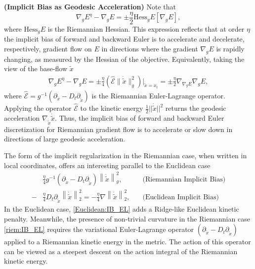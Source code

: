 \documentclass[reqno,11pt,letterpaper]{amsart}
\theoremstyle{plain}
\theoremstyle{definition}
\theoremstyle{remark}
\newcommand{\lr}[1]{\left(#1\right)}
\begin{document}
\textbf{(Implicit Bias as Geodesic Acceleration)} Note that
    \[
        \nabla_g E^\eta - \nabla_g E =\pm \frac{\eta}{2}\mathrm{Hess}_g E [\nabla_g E],
    \]
    where $\mathrm{Hess}_g E$ is the Riemannian Hessian. This expression reflects that at order $\eta$ the implicit bias of forward and backward Euler is to accelerate and decelerate, respectively, gradient flow on $E$ in directions where the gradient $\nabla_g E$ is rapidly changing, as measured by the Hessian of the objective. Equivalently, taking the view of the base-flow $\tilde{x}$
    \begin{align}\label{eq:EL_Riemann}
        \nabla_g E^\eta - \nabla_g E =\pm \frac{\eta}{4} \lr{\hat{\mathcal{E}} \big\lVert\dot{\tilde{x}}\big\rVert_{g}^2}\bigg|_{\dot{\tilde{x}} = \dot{x}_t} = \pm \frac{\eta}{2}\nabla_{\nabla_g E} \nabla_g E,
    \end{align}
where $\hat{\mathcal{E}} = g^{-1}(\partial_{\tilde{x}} - D_{t} \partial_{\dot{\tilde{x}}})$ is the Riemannian Euler-Lagrange operator. Applying the operator $\hat{\mathcal{E}}$ to the kinetic energy $\frac{1}{2}||\dot{\tilde{x}}||^2$ returns the geodesic acceleration $\nabla_{\dot{\tilde{x}}} \dot{\tilde{x}}$. Thus, the implicit bias of  forward and backward Euler discretization for Riemannian gradient flow is to accelerate or slow down in directions of large geodesic acceleration.

The form of the implicit regularization in the Riemannian case, when written in local coordinates, offers an interesting parallel to the Euclidean case \cite{smith2021on}
\begin{align}
    &\frac{\eta}{4}g^{-1}(\partial_{\tilde{x}} - D_{t} \partial_{\dot{\tilde{x}}}) \left\lVert \dot{\tilde{x}} \right\rVert_{g}^{2}, \quad
    &\text{(Riemannian Implicit Bias)} \label{riem:IB_EL}\\
    -&\frac{\eta}{4} D_{t} \partial_{\dot{\tilde{x}}} \left\lVert \dot{\tilde{x}}  \right\rVert_{2}^{2} = -\frac{\eta}{4} \nabla \left\lVert \dot{\tilde{x}}  \right\rVert_{2}^{2}, \quad
    &\text{(Euclidean Implicit Bias)}\label{Euclidean:IB_EL}
\end{align}
In the Euclidean case, \eqref{Euclidean:IB_EL} adds a Ridge-like Euclidean kinetic penalty. Meanwhile, the presence of non-trivial curvature in the Riemannian case \eqref{riem:IB_EL} requires the variational Euler-Lagrange operator $(\partial_{\tilde{x}} - D_{t} \partial_{\dot{\tilde{x}}})$ applied to a Riemannian kinetic energy in the metric. The action of this operator can be viewed as a steepest descent on the action integral \cite{gill2023, calcvar} of the Riemannian kinetic energy.
\end{document}
